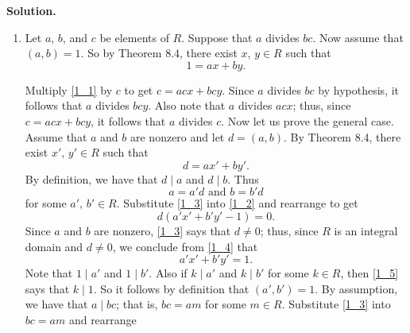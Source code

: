 \documentclass[9pt]{article}
\begin{document}
\begin{enumerate}
      \textbf{Solution.}

      \begin{enumerate}
         \item Let $a$, $b$, and $c$ be elements of $R$. Suppose that $a$
               divides $bc$. Now assume that $(a, b) = 1$. So by Theorem 8.4, 
               there exist $x$, $y \in R$ such that
               \begin{equation} \label{1_1}
                  1 = ax + by.
               \end{equation}

               Multiply \eqref{1_1} by $c$ to get $c = acx + bcy$. Since $a$
               divides $bc$ by hypothesis, it follows that $a$ divides $bcy$.
               Also note that $a$ divides $acx$; thus, since $c = acx + bcy$, it 
               follows that $a$ divides $c$. Now let us prove the general case.
               Assume that $a$ and $b$ are nonzero and let $d = (a, b)$. By 
               Theorem 8.4, there exist $x'$, $y' \in R$ such that
               \begin{equation} \label{1_2}
                  d = ax' + by'.
               \end{equation}
               By definition, we have that $d \mid a$ and $d \mid b$. Thus
               \begin{equation} \label{1_3}
                  a = a'd \text{ and } b = b'd
               \end{equation}
               for some $a'$, $b' \in R$. Substitute \eqref{1_3} into
               \eqref{1_2} and rearrange to get
               \begin{equation} \label{1_4}
                  d(a'x' + b'y' - 1) = 0.
               \end{equation}
               Since $a$ and $b$ are nonzero, \eqref{1_3} says that $d \neq 0$;
               thus, since $R$ is an integral domain and $d \neq 0$, we conclude
               from \eqref{1_4} that
               \begin{equation} \label{1_5}
                  a'x' + b'y' = 1.
               \end{equation}
               Note that $1 \mid a'$ and $1 \mid b'$. Also if $k \mid a'$ and
               $k \mid b'$ for some $k \in R$, then \eqref{1_5} says that
               $k \mid 1$. So it follows by definition that $(a', b') = 1$. By
               assumption, we have that $a \mid bc$; that is, $bc = am$ for some
               $m \in R$. Substitute \eqref{1_3} into  $bc = am$ and rearrange

\end{enumerate}
\end{enumerate}
\end{document}
